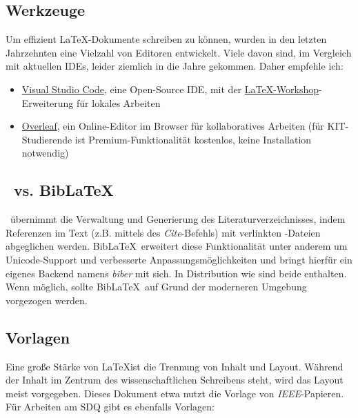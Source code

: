 \subsection{Werkzeuge}
\label{sec:Schreiben:Werkzeuge}

Um effizient \LaTeX-Dokumente schreiben zu können, wurden in den letzten Jahrzehnten eine Vielzahl von Editoren entwickelt. Viele davon sind, im Vergleich mit aktuellen IDEs, leider ziemlich in die Jahre gekommen. Daher empfehle ich:

\smallskip
\begin{itemize}[label={\symbolTool}]
    \item \href{https://code.visualstudio.com/}{Visual Studio Code}, eine Open-Source IDE, mit der \href{https://marketplace.visualstudio.com/items?itemName=James-Yu.latex-workshop}{LaTeX-Workshop}-Erweiterung für lokales Arbeiten
    \item \href{http://overleaf.com/}{Overleaf}, ein Online-Editor im Browser für kollaboratives Arbeiten (für KIT-Studierende ist Premium-Funktionalität kostenlos, keine Installation notwendig)
\end{itemize}
\smallskip

\subsection{\bibtex\ vs. Bib\LaTeX}
\label{sec:Schreiben:Bibtex}

\bibtex\ übernimmt die Verwaltung und Generierung des Literaturverzeichnisses, indem Referenzen im Text (z.B. mittels des \emph{Cite}-Befehls) mit verlinkten -Dateien abgeglichen werden. 
Bib\LaTeX\ erweitert diese Funktionalität unter anderem um Unicode-Support und verbesserte Anpassungsmöglichkeiten und bringt hierfür ein eigenes Backend namens \emph{biber} mit sich. 
In Distribution wie  sind beide enthalten. 
Wenn möglich, sollte Bib\LaTeX\ auf Grund der moderneren Umgebung vorgezogen werden.

\subsection{Vorlagen}
\label{sec:Schreiben:Vorlagen}

Eine große Stärke von \LaTeX ist die Trennung von Inhalt und Layout. 
Während der Inhalt im Zentrum des wissenschaftlichen Schreibens steht, wird das Layout meist vorgegeben. 
Dieses Dokument etwa nutzt die Vorlage von \emph{IEEE}-Papieren. Für Arbeiten am SDQ gibt es ebenfalls Vorlagen:

